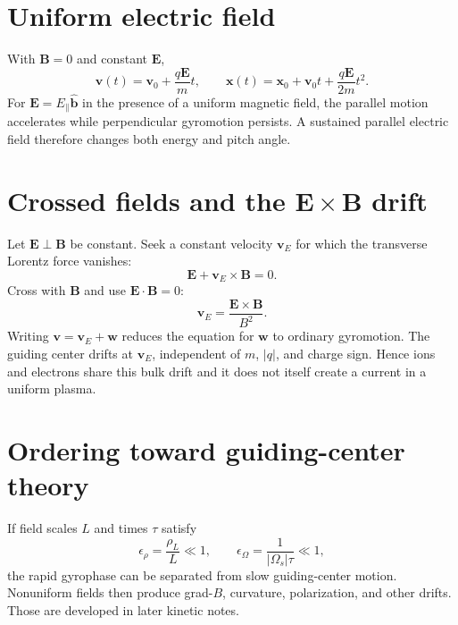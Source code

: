 \documentclass[11pt]{article}
\begin{document}
\section{Uniform electric field}

With $\mathbf B=0$ and constant $\mathbf E$,
\begin{equation}
\mathbf v(t)=\mathbf v_0+\frac{q\mathbf E}{m}t,\qquad
\mathbf x(t)=\mathbf x_0+\mathbf v_0t+\frac{q\mathbf E}{2m}t^2.
\end{equation}
For $\mathbf E=E_\parallel\hat{\mathbf b}$ in the presence of a uniform magnetic field, the parallel motion accelerates while perpendicular gyromotion persists. A sustained parallel electric field therefore changes both energy and pitch angle.


\section{Crossed fields and the $\mathbf E\times\mathbf B$ drift}

Let $\mathbf E\perp\mathbf B$ be constant. Seek a constant velocity $\mathbf v_E$ for which the transverse Lorentz force vanishes:
\begin{equation}
\mathbf E+\mathbf v_E\times\mathbf B=0.
\end{equation}
Cross with $\mathbf B$ and use $\mathbf E\cdot\mathbf B=0$:
\begin{equation}
\boxed{\mathbf v_E=\frac{\mathbf E\times\mathbf B}{B^2}}.
\end{equation}
Writing $\mathbf v=\mathbf v_E+\mathbf w$ reduces the equation for $\mathbf w$ to ordinary gyromotion. The guiding center drifts at $\mathbf v_E$, independent of $m$, $|q|$, and charge sign. Hence ions and electrons share this bulk drift and it does not itself create a current in a uniform plasma.


\section{Ordering toward guiding-center theory}

If field scales $L$ and times $\tau$ satisfy
\begin{equation}
\epsilon_\rho=\frac{\rho_L}{L}\ll1,\qquad
\epsilon_\Omega=\frac{1}{|\Omega_s|\tau}\ll1,
\end{equation}
the rapid gyrophase can be separated from slow guiding-center motion. Nonuniform fields then produce grad-$B$, curvature, polarization, and other drifts. Those are developed in later kinetic notes.
\end{document}
